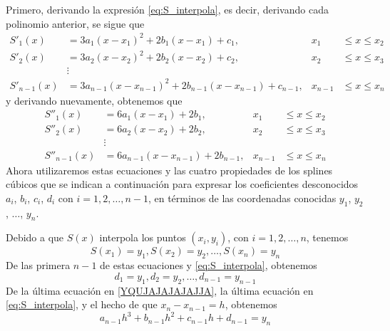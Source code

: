Primero, derivando la expresión \eqref{eq:S_interpola}, es decir, derivando cada polinomio anterior, se sigue que
\begin{align*}
    S'_1(x) & = 3a_1(x - x_1)^2 + 2b_1(x - x_1) + c_1, & x_1 & \leq x \leq x_2 \\
    S'_2(x) & = 3a_2(x - x_2)^2 + 2b_2(x - x_2) + c_2, & x_2 & \leq x \leq x_3 \\
    & \vdots & & \\
    S'_{n-1}(x) & = 3a_{n-1}(x - x_{n-1})^2 + 2b_{n-1}(x - x_{n-1}) + c_{n-1}, & x_{n-1} & \leq x \leq x_n
\end{align*}\newpage\noindent
y derivando nuevamente, obtenemos que
\begin{align*}
    S''_1(x) & = 6a_1(x - x_1) + 2b_1, & x_1 & \leq x \leq x_2 \\
    S''_2(x) & = 6a_2(x - x_2) + 2b_2, & x_2 & \leq x \leq x_3 \\
    & \vdots & & \\
    S''_{n-1}(x) & = 6a_{n-1}(x - x_{n-1}) + 2b_{n-1}, & x_{n-1} & \leq x \leq x_n
\end{align*}
Ahora utilizaremos estas ecuaciones y las cuatro propiedades de los splines cúbicos que se indican a continuación para expresar los coeficientes desconocidos $a_i$, $b_i$, $c_i$, $d_i$ con $i = 1, 2, \dots, n - 1$, en términos de las coordenadas conocidas $y_1$, $y_2$, $\dots$, $y_n$.

\begin{tcolorbox}[
        arc=0mm, 
        bottomtitle=0.5mm,
        boxrule=0mm,
        colbacktitle=black!10!white, 
        coltitle=black,
        left=2.5mm,
        leftrule=1mm,
        right=3.5mm,
        title={$S(x)$ interpola los puntos $(x_i, y_i)$ con $i = 1, 2, \dots, n$.},
        toptitle=0.75mm,
        colframe=black!30!white,
    ]
    Debido a que $S(x)$ interpola los puntos $(x_i, y_i)$, con $i = 1, 2, \dots, n$, tenemos
    \begin{equation}
        S(x_1) = y_1, S(x_2) = y_2, \dots, S(x_n) = y_n \label{YQUJAJAJAJAJJA}
    \end{equation}
    De las primera $n - 1$ de estas ecuaciones y \eqref{eq:S_interpola}, obtenemos
    \begin{equation}
        d_1 = y_1, d_2 = y_2, \dots, d_{n-1} = y_{n-1} \label{UAJAJJAUAUHVCFATQHH}
    \end{equation}
    De la última ecuación en \eqref{YQUJAJAJAJAJJA}, la última ecuación en \eqref{eq:S_interpola}, y el hecho de que $x_n - x_{n-1} = h$, obtenemos
    \begin{equation}
        a_{n-1}h^3 + b_{n-1}h^2 + c_{n-1}h + d_{n-1} = y_n \label{UAJAJAHHCCFGYYQUYQHUU}
    \end{equation}
\end{tcolorbox}

